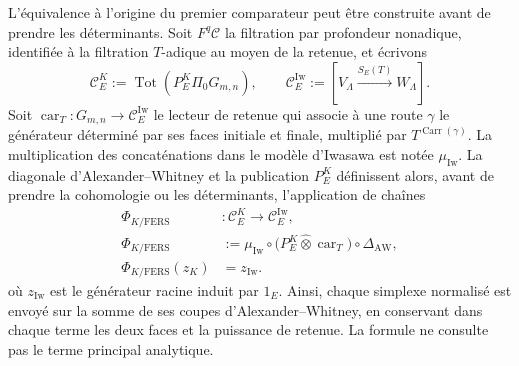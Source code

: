 L'équivalence à l'origine du premier comparateur peut être construite avant de
prendre les déterminants. Soit \(F^q\mathcal C\) la filtration par profondeur
nonadique, identifiée à la filtration \(T\)-adique au moyen de la retenue, et
écrivons
\begin{equation}\label{eq:amp-bsd-complejos-kato-iwasawa}
 \mathcal C_E^K
 :=\operatorname{Tot}\!\left(
 P_E^K\widehat\Pi_0G_{m,n}\right),
 \qquad
 \mathcal C_E^{\mathrm{Iw}}
 :=[V_\Lambda\xrightarrow{S_E(T)}W_\Lambda].
\end{equation}
Soit
\(\operatorname{car}_T:G_{m,n}\to\mathcal C_E^{\mathrm{Iw}}\) le lecteur
de retenue qui associe à une route \(\gamma\) le générateur déterminé par ses
faces initiale et finale, multiplié par
\(T^{\operatorname{Carr}(\gamma)}\). La multiplication des concaténations dans
le modèle d'Iwasawa est notée \(\mu_{\mathrm{Iw}}\). La diagonale
d'Alexander--Whitney et la publication \(P_E^K\) définissent alors, avant de
prendre la cohomologie ou les déterminants, l'application de chaînes
\begin{equation}\label{eq:amp-bsd-phi-kato-fers}
\begin{aligned}
 \Phi_{K/\mathrm{FERS}}&:
 \mathcal C_E^K\longrightarrow\mathcal C_E^{\mathrm{Iw}},\\
 \Phi_{K/\mathrm{FERS}}
 &:=
 \mu_{\mathrm{Iw}}\circ
 \bigl(P_E^K\widehat\otimes\operatorname{car}_T\bigr)
 \circ\Delta_{\mathrm{AW}},\\
 \Phi_{K/\mathrm{FERS}}(z_K)&=z_{\mathrm{Iw}}.
\end{aligned}
\end{equation}
où \(z_{\mathrm{Iw}}\) est le générateur racine induit par \(1_E\). Ainsi,
chaque simplexe normalisé est envoyé sur la somme de ses coupes
d'Alexander--Whitney, en conservant dans chaque terme les deux faces et la puissance
de retenue. La formule ne consulte pas le terme principal analytique.

